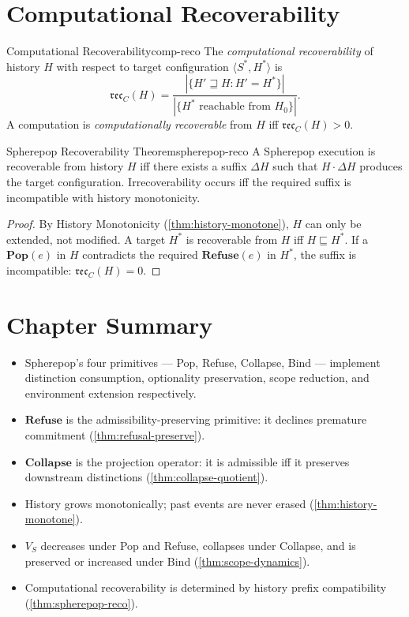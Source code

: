 \documentclass[12pt,twoside,openright]{book}
\newcommand{\reco}{\mathfrak{rec}}
\newenvironment{chapsummary}{%
  \begin{tcolorbox}[colback=DistBlue!5,colframe=DistBlue,
    title={\faBookOpen\enspace Summary},
    fonttitle=\sffamily\bfseries\color{white},
    attach boxed title to top left={yshift=-2mm,xshift=4mm},
    boxed title style={colback=DistBlue,rounded corners}]
  \begin{itemize}[nosep,leftmargin=*]}{%
  \end{itemize}\end{tcolorbox}}
\begin{document}
\section{Computational Recoverability}

\begin{definition}{Computational Recoverability}{comp-reco}
  The \emph{computational recoverability} of history $H$
  with respect to target configuration
  $\langle S^*, H^* \rangle$ is
  \[
    \reco_C(H)
    = \frac{|\{H' \sqsupseteq H : H' = H^*\}|}
           {|\{H^* \text{ reachable from } H_0\}|}.
  \]
  A computation is \emph{computationally recoverable}
  from $H$ iff $\reco_C(H) > 0$.
\end{definition}

\begin{theorem}{Spherepop Recoverability Theorem}{spherepop-reco}
  A Spherepop execution is recoverable from history $H$
  iff there exists a suffix $\Delta H$ such that
  $H \cdot \Delta H$ produces the target configuration.
  Irrecoverability occurs iff the required suffix is
  incompatible with history monotonicity.
\end{theorem}

\begin{proof}
  By History Monotonicity (\cref{thm:history-monotone}),
  $H$ can only be extended, not modified.
  A target $H^*$ is recoverable from $H$ iff $H \sqsubseteq H^*$.
  If a $\mathbf{Pop}(e)$ in $H$ contradicts the required
  $\mathbf{Refuse}(e)$ in $H^*$, the suffix is
  incompatible: $\reco_C(H) = 0$.
\end{proof}

\section*{Chapter Summary}
\begin{chapsummary}
  \item Spherepop's four primitives — Pop, Refuse,
        Collapse, Bind — implement distinction consumption,
        optionality preservation, scope reduction, and
        environment extension respectively.
  \item $\mathbf{Refuse}$ is the admissibility-preserving
        primitive: it declines premature commitment
        (\cref{thm:refusal-preserve}).
  \item $\mathbf{Collapse}$ is the projection operator:
        it is admissible iff it preserves downstream
        distinctions (\cref{thm:collapse-quotient}).
  \item History grows monotonically; past events are
        never erased (\cref{thm:history-monotone}).
  \item $V_S$ decreases under Pop and Refuse, collapses
        under Collapse, and is preserved or increased
        under Bind (\cref{thm:scope-dynamics}).
  \item Computational recoverability is determined by
        history prefix compatibility
        (\cref{thm:spherepop-reco}).
\end{chapsummary}
\end{document}
